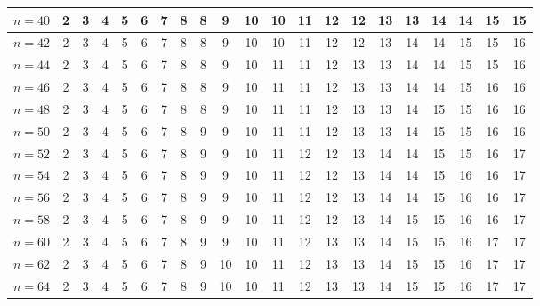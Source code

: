 \begin{adjustbox}{center}
\begin{tabular}{|c||c|c|c|c|c|c|c|c|c|c|c|c|c|c|c|c|c|c|c|c|}
$n=40$ & 2 & 3 & 4 & 5 & 6 & 7 & 8 & 8 & 9 & 10 & 10 & 11 & 12 & 12 & 13 & 13 & 14 & 14 & 15 & 15 \\ \hline
$n=42$ & 2 & 3 & 4 & 5 & 6 & 7 & 8 & 8 & 9 & 10 & 10 & 11 & 12 & 12 & 13 & 14 & 14 & 15 & 15 & 16 \\ \hline
$n=44$ & 2 & 3 & 4 & 5 & 6 & 7 & 8 & 8 & 9 & 10 & 11 & 11 & 12 & 13 & 13 & 14 & 14 & 15 & 15 & 16 \\ \hline
$n=46$ & 2 & 3 & 4 & 5 & 6 & 7 & 8 & 8 & 9 & 10 & 11 & 11 & 12 & 13 & 13 & 14 & 14 & 15 & 16 & 16 \\ \hline
$n=48$ & 2 & 3 & 4 & 5 & 6 & 7 & 8 & 8 & 9 & 10 & 11 & 11 & 12 & 13 & 13 & 14 & 15 & 15 & 16 & 16 \\ \hline
$n=50$ & 2 & 3 & 4 & 5 & 6 & 7 & 8 & 9 & 9 & 10 & 11 & 11 & 12 & 13 & 13 & 14 & 15 & 15 & 16 & 16 \\ \hline
$n=52$ & 2 & 3 & 4 & 5 & 6 & 7 & 8 & 9 & 9 & 10 & 11 & 12 & 12 & 13 & 14 & 14 & 15 & 15 & 16 & 17 \\ \hline
$n=54$ & 2 & 3 & 4 & 5 & 6 & 7 & 8 & 9 & 9 & 10 & 11 & 12 & 12 & 13 & 14 & 14 & 15 & 16 & 16 & 17 \\ \hline
$n=56$ & 2 & 3 & 4 & 5 & 6 & 7 & 8 & 9 & 9 & 10 & 11 & 12 & 12 & 13 & 14 & 14 & 15 & 16 & 16 & 17 \\ \hline
$n=58$ & 2 & 3 & 4 & 5 & 6 & 7 & 8 & 9 & 9 & 10 & 11 & 12 & 12 & 13 & 14 & 15 & 15 & 16 & 16 & 17 \\ \hline
$n=60$ & 2 & 3 & 4 & 5 & 6 & 7 & 8 & 9 & 9 & 10 & 11 & 12 & 13 & 13 & 14 & 15 & 15 & 16 & 17 & 17 \\ \hline
$n=62$ & 2 & 3 & 4 & 5 & 6 & 7 & 8 & 9 & 10 & 10 & 11 & 12 & 13 & 13 & 14 & 15 & 15 & 16 & 17 & 17 \\ \hline
$n=64$ & 2 & 3 & 4 & 5 & 6 & 7 & 8 & 9 & 10 & 10 & 11 & 12 & 13 & 13 & 14 & 15 & 15 & 16 & 17 & 17 \\ \hline
\end{tabular}
\end{adjustbox}
\\

